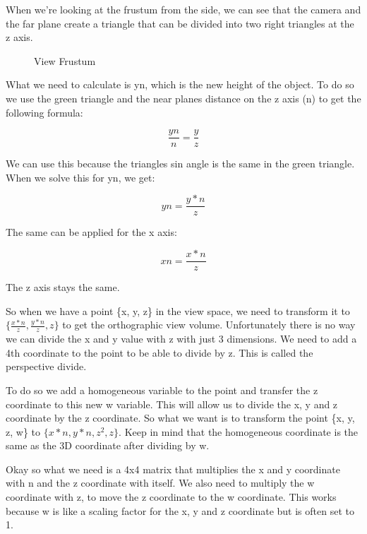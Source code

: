 \documentclass[12pt]{report} \usepackage{preamble}
\begin{document}
When we're looking at the frustum from the side, we can see that the camera and
the far plane create a triangle that can be divided into two right triangles at the
z axis.

\begin{figure}[hbtp]
	\centering 
	\caption{View Frustum}
\end{figure} \FloatBarrier

What we need to calculate is yn, which is the new height of the object.
To do so we use the green triangle and the near planes distance on the z axis
(n) to get the following formula:

\[
	\frac{yn}{n} = \frac{y}{z}
\]

We can use this because the triangles sin angle is the same in the green triangle.
When we solve this for yn, we get:

\[
	yn = \frac{y * n}{z}
\]

The same can be applied for the x axis:

\[
	xn = \frac{x * n}{z}
\]

The z axis stays the same.

So when we have a point \{x, y, z\} in the view space, we need to transform it to \\
\(\{\frac{x * n}{z}, \frac{y * n}{z}, z\}\) to get the orthographic view volume. Unfortunately
there is no way we can divide the x and y value with z with just 3 dimensions.
We need to add a 4th coordinate to the point to be able to
divide by z. This is called the perspective divide.

To do so we add a homogeneous variable to the point and transfer the z coordinate to this new w
variable. This will allow us to divide the x, y and z coordinate by the z coordinate.
So what we want is to transform the point \{x, y, z, w\} to \(\{x * n, y * n, z^2, z\}\).
Keep in mind that the homogeneous coordinate is the same as the 3D coordinate after dividing by w.

Okay so what we need is a 4x4 matrix that multiplies the x and y coordinate with n and the z coordinate
with itself. We also need to multiply the w coordinate with z,
to move the z coordinate to the w coordinate. This works because
w is like a scaling factor for the x, y and z coordinate but is often set to 1.
\end{document}
